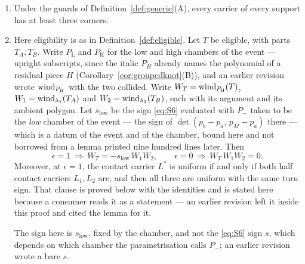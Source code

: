 \begin{lemma}\label{lem:selectorid}
\begin{enumerate}
\item[(A)] Under the guards of Definition~\ref{def:generic}(A), every carrier of every
support has at least three corners.
\item[(B)] Here eligibility is as in Definition~\ref{def:eligible}.
Let $T$ be eligible, with parts $T_A,T_B$. Write $P_{\mathrm L}$ and
$P_{\mathrm H}$ for the low and high chambers of the event --- upright
subscripts, since the italic $P_H$ already names the polynomial of a residual
piece $H$ (Corollary~\ref{cor:groupedknot}(B)), and an earlier revision wrote
$\operatorname{wind}_{P_H}$ with the two collided. Write $W_T=\operatorname{wind}_{P_{\mathrm H}}(T)$,
$W_1=\operatorname{wind}_{\lambda_1}(T_A)$ and $W_2=\operatorname{wind}_{\lambda_2}(T_B)$, each with its
argument and its ambient polygon. Let $s_{\mathrm{low}}$ be the sign \eqref{eq:S6} evaluated with $P_-$ taken to
be the \emph{low} chamber of the event --- the sign of
$\det(p_b-p_a,\,p_M-p_a)$ there --- which is a datum of the event and of the
chamber, bound here and not borrowed from a lemma printed nine hundred lines
later. Then
\[
\epsilon=1\ \Longrightarrow\ W_T=-s_{\mathrm{low}}\,W_1W_2,
\qquad
\epsilon=0\ \Longrightarrow\ W_T\,W_1W_2=0 .
\]
Moreover, at $\epsilon=1$, the contact carrier $L^{*}$ is uniform if and only if
both half contact carriers $L_1,L_2$ are, and then all three are uniform with
the same turn sign. That clause is proved below with the identities and is
stated here because a consumer reads it as a statement --- an earlier revision
left it inside this proof and cited the lemma for it.

The sign here is $s_{\mathrm{low}}$, fixed by the chamber, and not the
\eqref{eq:S6} sign $s$, which depends on which chamber the parametrisation calls
$P_-$; an earlier revision wrote a bare $s$.
\end{enumerate}
\end{lemma}
